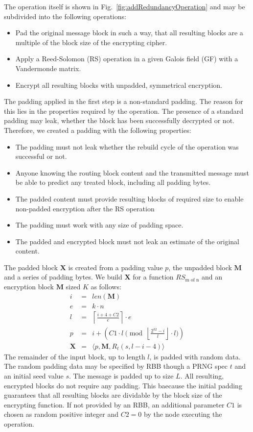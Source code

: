 \documentclass[acmsmall, screen, final, natbib=false]{acmart}
\begin{document}
	The operation itself is shown in Fig.~\ref{fig:addRedundancyOperation} and may be subdivided into the following operations:
	\begin{itemize}
		\item Pad the original message block in such a way, that all resulting blocks are a multiple of the block size of the encrypting cipher.
		\item Apply a Reed-Solomon (RS) operation in a given Galois field (GF) with a Vandermonde matrix.
		\item Encrypt all resulting blocks with unpadded, symmetrical encryption.
	\end{itemize}
	
	The padding applied in the first step is a non-standard padding. The reason for this lies in the properties required by the operation. The presence of a standard padding may leak, whether the block has been successfully decrypted or not. Therefore, we created a padding with the following properties:
	\begin{itemize}
		\item The padding must not leak whether the rebuild cycle of the operation was successful or not.
		\item Anyone knowing the routing block content and the transmitted message must be able to predict any treated block, including all padding bytes.
		\item The padded content must provide resulting blocks of required size to enable non-padded encryption after the RS operation
		\item The padding must work with any size of padding space.
		\item The padded and encrypted block must not leak an estimate of the original content.
	\end{itemize}
	
	The padded block $\mathbf{X}$ is created from a padding value $p$, the unpadded block $\mathbf{M}$ and a series of padding bytes. We build $\mathbf{X}$ for a function $RS_{\text{m of n}}$ and an encryption block $\mathbf{M}$ sized $K$ as follows:
	\begin{eqnarray}
	i          & = & len(\mathbf{M})\\
	e          & = & k \cdot n\\
	l          & = & \left\lceil\frac{i + 4 + C2 }{e}\right\rceil\cdot e\\
	p          & = & i + \left( C1 \cdot l \pmod{\left\lfloor\frac{2^{32}-i}{l}\right\rfloor\cdot l}\right)\\
	\mathbf{X} & = & \langle p,\mathbf{M},R_{t}\left(s,l-i-4\right)\rangle
	\end{eqnarray}    
	The remainder of the input block, up to length $l$, is padded with random data. The random padding data may be specified by RBB though a PRNG spec $t$ and an initial seed value $s$. The message is padded up to size $L$. All resulting, encrypted blocks do not require any padding. This baecause the initial padding guarantees that all resulting blocks are dividable by the block size of the encrypting function. If not provided by an RBB, an additional parameter $C1$ is chosen as random positive integer and $C2=0$  by the node executing the operation.
	
\end{document}
